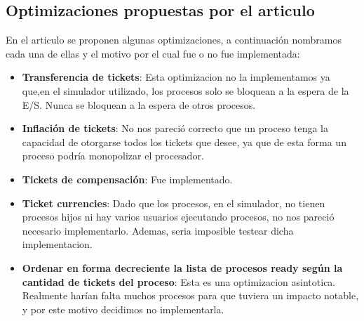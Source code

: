 
\subsection{Optimizaciones propuestas por el articulo}

En el articulo se proponen algunas optimizaciones, a continuación nombramos cada una de ellas y el motivo por el cual fue o no fue implementada:
\begin{itemize}
	\item \textbf{Transferencia de tickets}: Esta optimizacion no la implementamos ya que,en el simulador utilizado, los procesos solo se bloquean a la espera de la E/S. Nunca se bloquean a la espera de otros procesos.
	\item \textbf{Inflación de tickets}: No nos pareció correcto que un proceso tenga la capacidad de otorgarse todos los tickets que desee, ya que de esta forma un proceso podría monopolizar el procesador. 
	\item \textbf{Tickets de compensación}: Fue implementado.
	\item \textbf{Ticket currencies}: Dado que los procesos, en el simulador, no tienen procesos hijos ni hay varios usuarios ejecutando procesos, no nos pareció necesario implementarlo. Ademas, seria imposible testear dicha implementacion.
	\item \textbf{Ordenar en forma decreciente la lista de procesos ready según la cantidad de tickets del proceso}: Esta es una optimizacion asintotica. Realmente harían falta muchos procesos para que tuviera un impacto notable, y por este motivo decidimos no implementarla.
\end{itemize}
